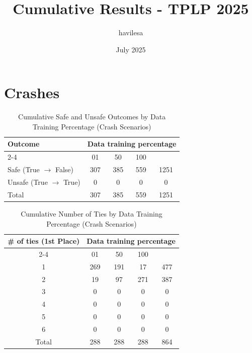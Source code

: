 \documentclass{article}
\title{Cumulative Results - TPLP 2025}
\author{havilesa}
\date{July 2025}
\begin{document}
\maketitle

\section{Crashes}
\begin{table}[h]
\centering
\caption{Cumulative Safe and Unsafe Outcomes by Data Training Percentage (Crash Scenarios)}
\begin{tabular}{l|ccc|c}
\toprule
\multirow{2}{*}{Outcome} & \multicolumn{5}{c|}{Data training percentage} & \multirow{2}{*}{Total} \\
\cmidrule{2-4}
 & 01 & 50 & 100 & \\
\midrule
Safe (True $\rightarrow$ False) & 307 & 385 & 559 & 1251 \\ 
Unsafe (True $\rightarrow$ True) & 0 & 0 & 0 & 0 \\ 
\midrule
Total & 307 & 385 & 559 & 1251 \\ 
\bottomrule
\end{tabular}
\end{table}

\begin{table}[h]
\centering
\caption{Cumulative Number of Ties by Data Training Percentage (Crash Scenarios)}
\begin{tabular}{c|ccc|c}
\toprule
\multirow{2}{*}{\# of ties (1st Place)} & \multicolumn{5}{c|}{Data training percentage} & \multirow{2}{*}{Total} \\
\cmidrule{2-4}
 & 01 & 50  & 100 & \\
\midrule
1 & 269 & 191 & 17 & 477 \\ 
2 & 19 & 97 & 271 & 387 \\ 
3 & 0 & 0 & 0 & 0 \\ 
4 & 0 & 0 & 0 & 0 \\ 
5 & 0 & 0 & 0 & 0 \\ 
6 & 0 & 0 & 0 & 0 \\ 
\midrule
Total & 288 & 288 & 288 & 864 \\ 
\bottomrule
\end{tabular}
\end{table}
\end{document}
